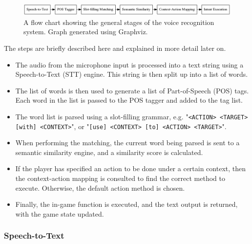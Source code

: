 \documentclass[11pt]{article}
\begin{document}
\begin{center}
\begin{figure}[H]
\begin{center}
  \includegraphics[width=\linewidth]{flow-chart.png}
  \caption{A flow chart showing the general stages of the voice recognition system. Graph generated using Graphviz.}
  \label{fig:flow-chart}
  \end{center}
\end{figure}
\end{center}

The steps are briefly described here and explained in more detail later on.

\begin{itemize}
\item The audio from the microphone input is processed into a text string using a Speech-to-Text (STT) engine. This string is then split up into a list of words.

\item The list of words is then used to generate a list of Part-of-Speech (POS) tags. Each word in the list is passed to the POS tagger and added to the tag list.

\item The word list is parsed using a slot-filling grammar, e.g. "\texttt{<ACTION> <TARGET> [with] <CONTEXT>}", or "\texttt{[use] <CONTEXT> [to] <ACTION> <TARGET>}".

\item When performing the matching, the current word being parsed is sent to a semantic similarity engine, and a similarity score is calculated.

\item If the player has specified an action to be done under a certain context, then the context-action mapping is consulted to find the correct method to execute. Otherwise, the default action method is chosen.

\item Finally, the in-game function is executed, and the text output is returned, with the game state updated.
\end{itemize}

\subsubsection{Speech-to-Text}
\end{document}
